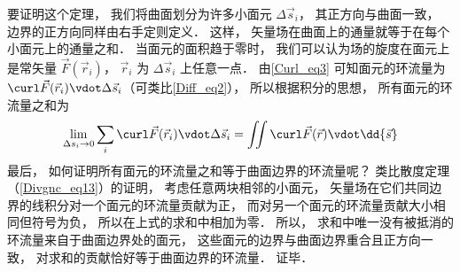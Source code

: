 要证明这个定理， 我们将曲面划分为许多小面元 $\Delta \vec s_i$， 其正方向与曲面一致， 边界的正方向同样由右手定则定义． 这样， 矢量场在曲面上的通量就等于在每个小面元上的通量之和． 当面元的面积趋于零时， 我们可以认为场的旋度在面元上是常矢量 $\vec F(\vec r_i)$， $\vec r_i$ 为 $\Delta \vec s_i$ 上任意一点． 由\autoref{Curl_eq3} 可知面元的环流量为 $\curl\vec F(\vec r_i) \vdot \Delta \vec s_i$（可类比\autoref{Diff_eq2}）， 所以根据积分的思想， 所有面元的环流量之和为
\begin{equation}
\lim_{\Delta s_i \to 0}\sum_i \curl\vec F(\vec r_i) \vdot \Delta \vec s_i = \iint \curl\vec F(\vec r) \vdot \dd{\vec s}
\end{equation}
最后， 如何证明所有面元的环流量之和等于曲面边界的环流量呢？ 类比散度定理（\autoref{Divgnc_eq13}）的证明， 考虑任意两块相邻的小面元， 矢量场在它们共同边界的线积分对一个面元的环流量贡献为正， 而对另一个面元的环流量贡献大小相同但符号为负， 所以在上式的求和中相加为零． 所以， 求和中唯一没有被抵消的环流量来自于曲面边界处的面元， 这些面元的边界与曲面边界重合且正方向一致， 对求和的贡献恰好等于曲面边界的环流量． 证毕．
